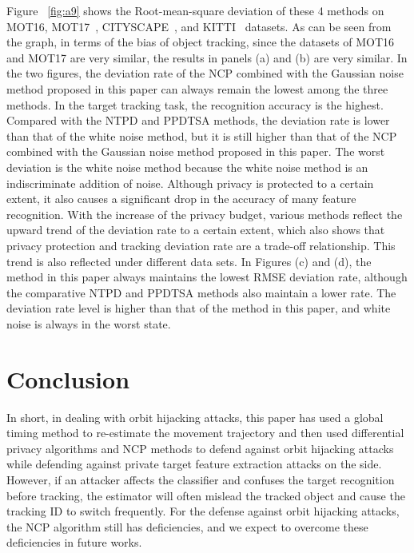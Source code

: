 \documentclass[trans]{IEEEtran}
\newcommand{\el}[1]{{\color{black}#1}}
\begin{document}
Figure ~\ref{fig:a9} shows the Root-mean-square deviation of these 4 methods on MOT16, MOT17~\cite{milan2016mot16}, CITYSCAPE~\cite{cordts2016cityscapes}, and KITTI~\cite{geiger2013vision} datasets. As can be seen from the graph, in terms of the bias of object tracking, since the datasets of MOT16 and MOT17 are very similar, the results in panels (a) and (b) are very similar.  \el{In the two figures, the deviation rate of the NCP combined with the Gaussian noise method proposed in this paper can always remain the lowest among the three methods. In the target tracking task, the recognition accuracy is the highest. Compared with the NTPD and PPDTSA methods, the deviation rate is lower than that of the white noise method, but it is still higher than that of the NCP combined with the Gaussian noise method proposed in this paper. The worst deviation is the white noise method because the white noise method is an indiscriminate addition of noise. Although privacy is protected to a certain extent, it also causes a significant drop in the accuracy of many feature recognition. With the increase of the privacy budget, various methods reflect the upward trend of the deviation rate to a certain extent, which also shows that privacy protection and tracking deviation rate are a trade-off relationship. This trend is also reflected under different data sets. In Figures (c) and (d), the method in this paper always maintains the lowest RMSE deviation rate, although the comparative NTPD and PPDTSA methods also maintain a lower rate. The deviation rate level is higher than that of the method in this paper, and white noise is always in the worst state.}


\section{Conclusion}
In short, in dealing with orbit hijacking attacks, this paper \el{ has used a global timing method to re-estimate the movement trajectory and then used differential privacy algorithms and NCP methods to defend against orbit hijacking attacks while defending against private target feature extraction attacks on the side. However, if an attacker affects the classifier and confuses the target recognition before tracking, the estimator will often mislead the tracked object and cause the tracking ID to switch frequently. For the defense against orbit hijacking attacks, the NCP algorithm still has deficiencies, and we expect to overcome these deficiencies in future works.}
\end{document}

